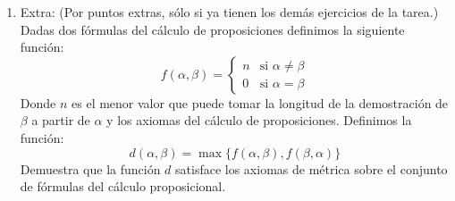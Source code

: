 \documentclass[11pt,answers]{exam}
\begin{document}
\begin{enumerate}
    \item Extra: (Por puntos extras, sólo si ya tienen los demás ejercicios de la tarea.) Dadas dos fórmulas del cálculo de proposiciones definimos la siguiente función:
    \[
    f(\alpha, \beta) = 
    \begin{cases}
    n & \text{si } \alpha \neq \beta \\
    0 & \text{si } \alpha = \beta
    \end{cases}
    \]
    Donde $n$ es el menor valor que puede tomar la longitud de la demostración de $\beta$ a partir de $\alpha$ y los axiomas del cálculo de proposiciones. Definimos la función:
    \[
    d(\alpha, \beta) = \max\{f(\alpha, \beta), f(\beta, \alpha)\}
    \]
    Demuestra que la función $d$ satisface los axiomas de métrica sobre el conjunto de fórmulas del cálculo proposicional.
    
\end{enumerate}
\end{document}
